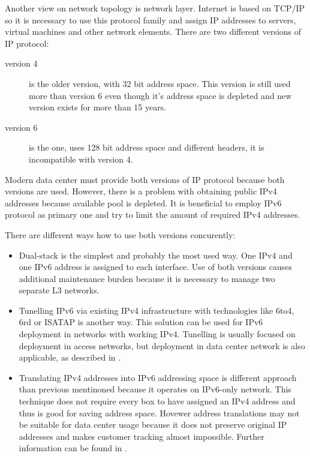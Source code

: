 Another view on network topology is network layer. Internet is based on \Ac{TCP}/\Ac{IP} so it is necessary to use this protocol family and assign \Ac{IP} addresses to servers, virtual machines and other network elements. There are two different versions of \Ac{IP} protocol:
\begin{description}
	\item[version 4] is the older version, with 32 bit address space. This version is still used more than version 6 even though it's address space is depleted and new version exists for more than 15 years.
	\item[version 6] is the  one, uses 128 bit address space and different headers, it is incompatible with version 4.
\end{description}

Modern data center must provide both versions of \Ac{IP} protocol because both versions are used.
However, there is a problem with obtaining public \Ac{IPv4} addresses because available pool is depleted. It is beneficial to employ \Ac{IPv6} protocol as primary one and try to limit the amount of required \Ac{IPv4} addresses.


There are different ways how to use both versions concurently:
\begin{itemize}
	\item Dual-stack is the simplest and probably the most used way. One \Ac{IPv4} and one \Ac{IPv6} address is assigned to each interface. Use of both versions causes additional maintenance burden because it is necessary to manage two separate L3 networks.
	\item Tunelling \Ac{IPv6} via existing \Ac{IPv4} infrastructure with technologies like 6to4, 6rd or \Ac{ISATAP} is another way. This solution can be used for \Ac{IPv6} deployment in networks with working \Ac{IPv4}. 
	Tunelling is usually focused on deployment in access networks, but deployment in data center network is also applicable, as described in \cite{draft-sakura-6rd}.
	\item Translating \Ac{IPv4} addresses into \Ac{IPv6} addressing space is different approach than previous mentinoned because it operates on \Ac{IPv6}-only network. This technique does not require every box to have assigned an \Ac{IPv4} address and thus is good for saving address space. Hovewer address translations may not be suitable for data center usage because it does not preserve original \Ac{IP} addresses and makes customer tracking almost impossible. Further information can be found in \cite{ipv4-jako-sluzba}.
\end{itemize}

